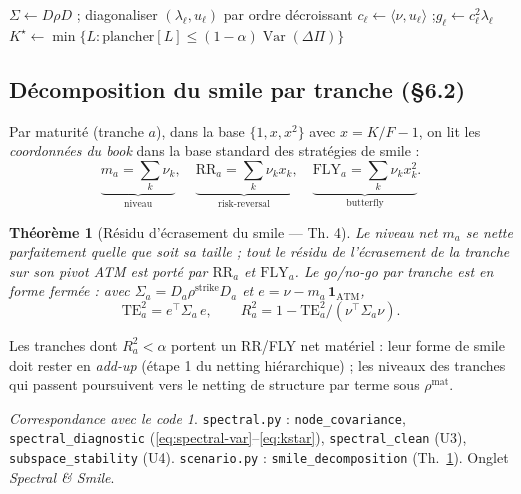 \documentclass[11pt,a4paper]{article}
\newcommand{\code}[1]{\texttt{#1}}
\DeclareMathOperator{\Var}{Var}
\newcommand{\dPi}{\Delta\Pi}
\theoremstyle{plain}
\newtheorem{theoreme}{Théorème}[section]
\theoremstyle{definition}
\theoremstyle{remark}
\newtheorem*{impl}{Correspondance avec le code}
\begin{document}
\begin{algorithm}[H]
\caption{Diagnostic spectral et $K^\star(\alpha)$}
$\Sigma \leftarrow D\rho D$ ; diagonaliser $(\lambda_\ell, u_\ell)$ par ordre décroissant\;
$c_\ell \leftarrow \langle \nu, u_\ell\rangle$ ;\quad $g_\ell \leftarrow c_\ell^2\lambda_\ell$\;
$K^\star \leftarrow \min\{L : \text{plancher}[L] \le (1-\alpha)\Var(\dPi)\}$\;
\;
\end{algorithm}

\subsection{Décomposition du smile par tranche (\S6.2)}
Par maturité (tranche $a$), dans la base $\{1, x, x^2\}$ avec $x = K/F - 1$, on lit les
\emph{coordonnées du book} dans la base standard des stratégies de smile :
\begin{equation}
\underbrace{m_a = \textstyle\sum_k \nu_k}_{\text{niveau}},\quad
\underbrace{\mathrm{RR}_a = \textstyle\sum_k \nu_k x_k}_{\text{risk-reversal}},\quad
\underbrace{\mathrm{FLY}_a = \textstyle\sum_k \nu_k x_k^2}_{\text{butterfly}}.
\end{equation}

\begin{theoreme}[Résidu d'écrasement du smile --- Th. 4]\label{th:smile}
Le niveau net $m_a$ se nette \emph{parfaitement quelle que soit sa taille} ; tout le
résidu de l'écrasement de la tranche sur son pivot ATM est porté par $\mathrm{RR}_a$ et
$\mathrm{FLY}_a$. Le go/no-go par tranche est en forme fermée : avec $\Sigma_a = D_a
\rho^{\mathrm{strike}} D_a$ et $e = \nu - m_a\,\mathbf 1_{\text{ATM}}$,
\[ \mathrm{TE}^2_a = e^\top \Sigma_a\, e, \qquad
   R^2_a = 1 - \mathrm{TE}^2_a / (\nu^\top \Sigma_a \nu). \]
\end{theoreme}

Les tranches dont $R^2_a < \alpha$ portent un RR/FLY net matériel : leur forme de smile
doit rester en \emph{add-up} (étape 1 du netting hiérarchique) ; les niveaux des
tranches qui passent poursuivent vers le netting de structure par terme sous
$\rho^{\mathrm{mat}}$.

\begin{impl}
\code{spectral.py} : \code{node\_covariance}, \code{spectral\_diagnostic}
(\eqref{eq:spectral-var}--\eqref{eq:kstar}), \code{spectral\_clean} (U3),
\code{subspace\_stability} (U4). \code{scenario.py} : \code{smile\_decomposition}
(Th.~\ref{th:smile}). Onglet \emph{Spectral \& Smile}.
\end{impl}
\end{document}
